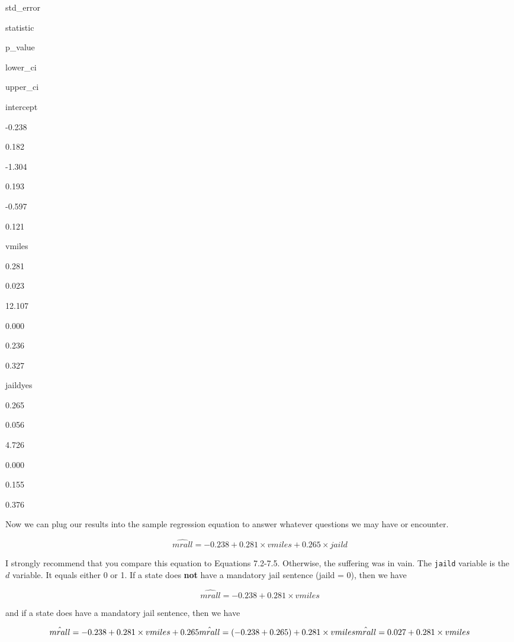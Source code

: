 \documentclass[
]{book}
\begin{document}
std\_error

statistic

p\_value

lower\_ci

upper\_ci

intercept

-0.238

0.182

-1.304

0.193

-0.597

0.121

vmiles

0.281

0.023

12.107

0.000

0.236

0.327

jaildyes

0.265

0.056

4.726

0.000

0.155

0.376

Now we can plug our results into the sample regression equation to answer whatever questions we may have or encounter.

\begin{equation}
\hat{mrall} = -0.238 + 0.281\times vmiles + 0.265 \times jaild
\end{equation}

I strongly recommend that you compare this equation to Equations 7.2-7.5. Otherwise, the suffering was in vain. The \texttt{jaild} variable is the \(d\) variable. It equals either 0 or 1. If a state does \textbf{not} have a mandatory jail sentence (jaild = 0), then we have

\begin{equation}
\hat{mrall} = -0.238 + 0.281\times vmiles
\end{equation}

and if a state does have a mandatory jail sentence, then we have

\begin{equation}
\hat{mrall} = -0.238 + 0.281\times vmiles + 0.265\\
\hat{mrall} = (-0.238 + 0.265) + 0.281\times vmiles\\
\hat{mrall} = 0.027 + 0.281\times vmiles
\end{equation}
\end{document}
